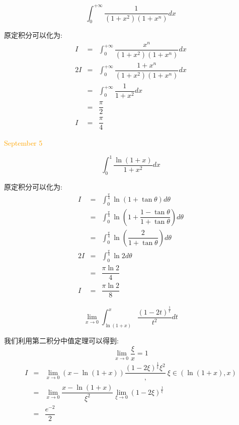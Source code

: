\begin{example}[][Exam: 35.1.8]
	$$\int_{0}^{+\infty}\dfrac{1}{(1+x^2)(1+x^n)}dx$$
\end{example}

\begin{solution}

	原定积分可以化为:  
	\begin{eqnarray*}
		I&=&\int_{0}^{+\infty}\dfrac{x^n}{(1+x^2)(1+x^n)}dx\\
		2I&=&\int_{0}^{+\infty}\dfrac{1+x^n}{(1+x^2)(1+x^n)}dx\\
		&=&\int_{0}^{+\infty}\dfrac{1}{1+x^2}dx\\
		&=&\dfrac{\pi}{2}\\
		I&=&\dfrac{\pi}{4}
	\end{eqnarray*}
\end{solution}


\textcolor{orange}{September 5}

\begin{example}[][Exam: 35.1.9]
	$$\int_{0}^{1}\dfrac{\ln(1+x)}{1+x^2}dx$$

\end{example}
\begin{solution}

	原定积分可以化为:  
	\begin{eqnarray*}
		I&=&\int_{0}^{\frac{\pi}{4}}\ln(1+\tan \theta)d\theta\\
		&=&\int_{0}^{\frac{\pi}{4}}\ln(1+\dfrac{1-\tan\theta}{1+\tan\theta})d\theta\\
		&=&\int_{0}^{\frac{\pi}{4}}\ln(\dfrac{2}{1+\tan\theta})d\theta\\
		2I&=&\int_{0}^{\frac{\pi}{4}}\ln2d\theta\\
		&=&\dfrac{\pi \ln 2}{4}\\
		I&=&\dfrac{\pi \ln 2}{8}
	\end{eqnarray*}
\end{solution}

\begin{example}[][Exam: 35.1.10]
	$$\lim\limits_{x\to 0}\int_{\ln(1+x)}^{x}\dfrac{(1-2t)^{\frac{1}{t}}}{t^2}dt$$
\end{example}

\begin{solution}

	我们利用第二积分中值定理可以得到:  
	$$\lim\limits_{x\to 0}\dfrac{\xi}{x}=1$$
	\begin{eqnarray*}
		I&=&\lim\limits_{x\to 0}(x-\ln(1+x))\dfrac{(1-2\xi)^{\frac{1}{\xi}}{\xi^2}},\ \xi\in(\ln(1+x),x)\\
		 &=&\lim\limits_{x\to 0}\dfrac{x-\ln(1+x)}{\xi^2}\lim\limits_{\xi\to 0}(1-2\xi)^{\frac{1}{\xi}}\\
		 &=&\dfrac{e^{-2}}{2}
	\end{eqnarray*}
\end{solution}


